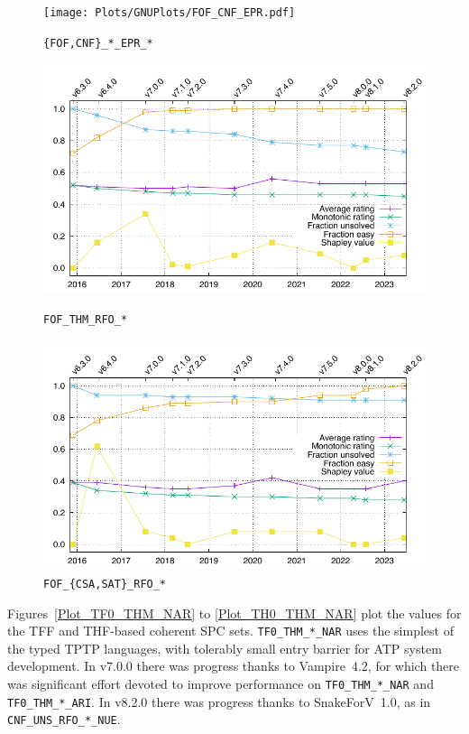 \documentclass[runningheads]{llncs}
\begin{document}
\begin{figure}[h!]
\begin{minipage}[t]{.49\textwidth}
  \centering
  \texttt{[image: Plots/GNUPlots/FOF\_CNF\_EPR.pdf]}
  \vspace*{-2em}
  \caption{{\tt \{FOF,CNF\}\_*\_EPR\_*}}
  \label{Plot_FOF_CNF_EPR}
\end{minipage}
\begin{minipage}[t]{.49\textwidth}
  \centering
  \includegraphics[width=\textwidth]{Plots/GNUPlots/FOF_THM_RFO.pdf}
  \vspace*{-2em}
  \caption{{\tt FOF\_THM\_RFO\_*}}
  \label{Plot_FOF_THM_RFO}
\end{minipage}
\begin{minipage}[t]{.49\textwidth}
  \centering
  \includegraphics[width=\textwidth]{Plots/GNUPlots/FOF_CSA_SAT_RFO.pdf}
  \vspace*{-2em}
  \caption{{\tt FOF\_\{CSA,SAT\}\_RFO\_*}}
  \label{Plot_FOF_CSA_SAT_RFO}
\end{minipage}
\end{figure}

Figures~\ref{Plot_TF0_THM_NAR} to \ref{Plot_TH0_THM_NAR} plot the values for the TFF and
THF-based coherent SPC sets.
{\tt TF0\_THM\_*\_NAR} uses the simplest of the typed TPTP languages, with tolerably small
entry barrier for ATP system development.
In v7.0.0 there was progress thanks to Vampire~4.2, for which there was significant effort
devoted to improve performance on {\tt TF0\_THM\_*\_NAR} and {\tt TF0\_THM\_*\_ARI}.
In v8.2.0 there was progress thanks to SnakeForV~1.0, as in {\tt CNF\_UNS\_RFO\_*\_NUE}.
\end{document}
